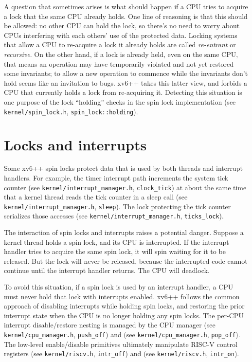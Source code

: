 A question that sometimes arises is what should happen if a CPU tries
to acquire a lock that the same CPU already holds. One line of
reasoning is that this should be allowed: no other CPU can hold the
lock, so there's no need to worry about CPUs interfering with each
others' use of the protected data. Locking systems that allow a CPU to
re-acquire a lock it already holds are called {\it re-entrant} or {\it
recursive}. On the other hand, if a lock is already held, even on
the same CPU, that means an operation may have temporarily violated
and not yet restored some invariants; to allow a new operation to
commence while the invariants don't hold seems like an invitation to
bugs. xv6++ takes this latter view, and forbids a CPU that currently
holds a lock from re-acquiring it. Detecting this situation is one purpose
of the lock ``holding'' checks in the spin lock implementation
(see \texttt{kernel/spin\_lock.h}, \texttt{spin\_lock::holding}).

\section{Locks and interrupts}
\label{s:lockinter}

Some xv6++ spin locks protect data that is used by
both threads and interrupt handlers.
For example, the timer interrupt path increments the system tick counter
(see \texttt{kernel/interrupt\_manager.h}, \texttt{clock\_tick})
at about the same time that a kernel
thread reads the tick counter in a sleep call
(see \texttt{kernel/interrupt\_manager.h}, \texttt{sleep}).
The lock protecting the tick counter serializes those accesses
(see \texttt{kernel/interrupt\_manager.h}, \texttt{ticks\_lock}).

The interaction of spin locks and interrupts raises a potential danger.
Suppose a kernel thread holds a spin lock, and its CPU is interrupted.
If the interrupt handler tries to acquire the same spin lock, it will spin
waiting for it to be released. But the lock will never be released,
because the interrupted code cannot continue until the interrupt handler returns.
The CPU will deadlock.

To avoid this situation, if a spin lock is used by an interrupt handler,
a CPU must never hold that lock with interrupts enabled.
xv6++ follows the common approach of disabling interrupts while holding
spin locks, and restoring the prior interrupt state when the CPU is no longer
holding any spin locks. The per-CPU interrupt disable/restore nesting is managed
by the CPU manager
(see \texttt{kernel/cpu\_manager.h}, \texttt{push\_off})
and (see \texttt{kernel/cpu\_manager.h}, \texttt{pop\_off}).
The low-level enable/disable primitives ultimately manipulate RISC-V
control registers
(see \texttt{kernel/riscv.h}, \texttt{intr\_off})
and (see \texttt{kernel/riscv.h}, \texttt{intr\_on}).

